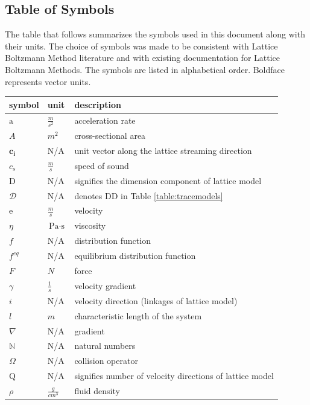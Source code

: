 \documentclass[12pt]{article}
\begin{document}
\subsection{Table of Symbols}

The table that follows summarizes the symbols used in this document along with
their units.  The choice of symbols was made to be consistent with Lattice Boltzmann Method literature and with existing documentation for Lattice Boltzmann Methods. The symbols are listed in alphabetical order. Boldface represents vector units.

\renewcommand{\arraystretch}{1.2}
\noindent \begin{longtable*}{l l p{12cm}} \toprule
\textbf{symbol} & \textbf{unit} & \textbf{description}\\
\midrule 
$\mathrm{a}$ & $\frac{m}{s^2}$ & acceleration rate
\\
$A$ & $m^2$ & cross-sectional area
\\
$\textbf{c}_\textbf{i}$ & N/A & unit vector along the lattice streaming direction
\\
$c_s$ & $\frac{m}{s}$ & speed of sound
\\
$\mathrm{D}$ & N/A & signifies the dimension component of lattice model
\\
$\mathscr{D}$ & N/A & denotes DD in Table \ref{table:tracemodels}
\\
$\mathrm{e}$ & $\frac{m}{s}$ & velocity
\\
$\eta$ & $\si{\pascal}\cdot\si{\second}$ & viscosity
\\ 
$f$ & N/A & distribution function
\\
$f^{eq}$ & N/A & equilibrium distribution function
\\
$F$ & $N$ & force
\\
$\gamma$ & $\frac{1}{s}$ & velocity gradient
\\
$i$ & N/A & velocity direction (linkages of lattice model)
\\
$l$ & $m$ & characteristic length of the system
\\
$\nabla$ & N/A & gradient
\\
$\mathbb{N}$ & N/A & natural numbers
\\
$\Omega$ & N/A & collision operator
\\
$\mathrm{Q}$ & N/A & signifies number of velocity directions of lattice model
\\
$\rho$ & $\frac{g}{cm^3}$ & fluid density

\end{longtable*}
\end{document}
